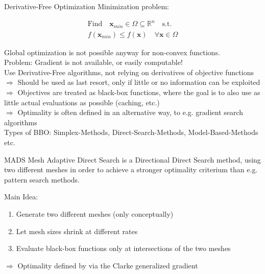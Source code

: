 \documentclass[aspectratio=43,t]{beamer}
\renewcommand{\vec}[1]{\mathbf{#1}}
\begin{document}
	\begin{frame}[fragile]{Derivative-Free Optimization}
		Minimization problem:

    	\begin{equation*}
        	\begin{gathered}
        	\text{Find} \quad \vec{x}_{min} \in \Omega \subseteq \mathbb{R}^n \quad \text{s.t.}\\
        	f(\vec{x}_{min}) \leq f(\vec{x}) \quad \forall \vec{x} \in \Omega
        	\end{gathered} 
    	\end{equation*}

		Global optimization is not possible anyway for non-convex functions.\\
		Problem: Gradient is not available, or easily computable!\\
		Use Derivative-Free algorithms, not relying on derivatives of objective functions\\
		\bigskip
		$\Rightarrow$ Should be used as last resort, only if little or no information can be exploited\\
		\bigskip
		$\Rightarrow$ Objectives are treated as black-box functions, where the goal is to also use as little
		actual evaluations as possible (caching, etc.)\\
		\bigskip
		$\Rightarrow$ Optimality is often defined in an alternative way, to e.g. gradient search algorithms\\
		\bigskip
		Types of BBO: Simplex-Methods, Direct-Search-Methods, Model-Based-Methods etc.
	\end{frame}

	\begin{frame}[fragile]{MADS}
		Mesh Adaptive Direct Search is a Directional Direct Search method, using two different
		meshes in order to achieve a stronger optimality criterium than e.g. pattern search methods.\\
		\bigskip
		
		\begin{block}{Main Idea:}
      	\begin{enumerate}
			\item<2-> Generate two different meshes (only conceptually)
        	\item<3-> Let mesh sizes shrink at different rates
        	\item<4-> Evaluate black-box functions only at intersections of the two meshes
      	\end{enumerate}
		\bigskip
		$\Rightarrow$ Optimality defined by via the Clarke generalized gradient
    \end{block}
	\end{frame}
\end{document}
